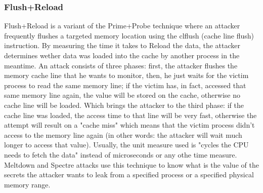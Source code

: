 \subsubsection{Flush+Reload}
Flush+Reload is a variant of the Prime+Probe technique  where an attacker
frequently flushes a targeted memory location using the clflush (cache line flush) instruction. By measuring the time it takes to Reload
the data, the attacker determines wether data was loaded into the cache by another process in the meantime.
An attack consists of three phases: first, the attacker flushes the memory cache line that he wants to monitor, then, he just waits for the victim process to read the same
memory line; if the victim has, in fact, accessed that same memory line again, the value will be stored on the cache, otherwise no cache line will be loaded. Which brings
the attacker to the third phase: if the cache line was loaded, the access time to that line will be very fast, otherwise the attempt will result on a "cache miss" which
means that the victim process didn't access to the memory line again (in other words: the attacker will wait much longer to access that value). Usually, the unit measure
used is "cycles the CPU needs to fetch the data" instead of microseconds or any othe time measure.
Meltdown and Spectre attacks use this technique to know what is the value of the secrets the attacker
wants to leak from a specified process or a specified physical memory range.
